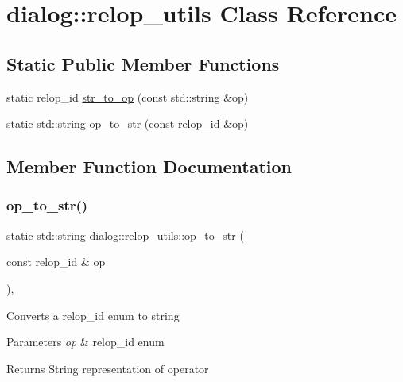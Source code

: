 \hypertarget{classdialog_1_1relop__utils}{}\section{dialog\+:\+:relop\+\_\+utils Class Reference}
\label{classdialog_1_1relop__utils}
\subsection*{Static Public Member Functions}
\begin{DoxyCompactItemize}
\item 
static relop\+\_\+id \hyperlink{classdialog_1_1relop__utils_a6dd36213f1e18ce3408281da2dae561c}{str\+\_\+to\+\_\+op} (const std\+::string \&op)
\item 
static std\+::string \hyperlink{classdialog_1_1relop__utils_aa2ece63f9eb4bc6e0af2aef09fcfc8e2}{op\+\_\+to\+\_\+str} (const relop\+\_\+id \&op)
\end{DoxyCompactItemize}


\subsection{Member Function Documentation}
\mbox{\label{classdialog_1_1relop__utils_aa2ece63f9eb4bc6e0af2aef09fcfc8e2}} 
\subsubsection{\texorpdfstring{op\+\_\+to\+\_\+str()}{op\_to\_str()}}
{\footnotesize\ttfamily static std\+::string dialog\+::relop\+\_\+utils\+::op\+\_\+to\+\_\+str (\begin{DoxyParamCaption}\item[{const relop\+\_\+id \&}]{op }\end{DoxyParamCaption})\hspace{0.3cm}{\ttfamily [inline]}, {\ttfamily [static]}}

Converts a relop\+\_\+id enum to string


\begin{DoxyParams}{Parameters}
{\em op} & relop\+\_\+id enum \\
\hline
\end{DoxyParams}
\begin{DoxyReturn}{Returns}
String representation of operator 
\end{DoxyReturn}
\mbox{\label{classdialog_1_1relop__utils_a6dd36213f1e18ce3408281da2dae561c}} 
